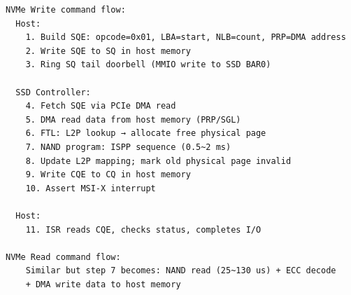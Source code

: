 \begin{lstlisting}
NVMe Write command flow:
  Host:
    1. Build SQE: opcode=0x01, LBA=start, NLB=count, PRP=DMA address
    2. Write SQE to SQ in host memory
    3. Ring SQ tail doorbell (MMIO write to SSD BAR0)

  SSD Controller:
    4. Fetch SQE via PCIe DMA read
    5. DMA read data from host memory (PRP/SGL)
    6. FTL: L2P lookup → allocate free physical page
    7. NAND program: ISPP sequence (0.5~2 ms)
    8. Update L2P mapping; mark old physical page invalid
    9. Write CQE to CQ in host memory
    10. Assert MSI-X interrupt

  Host:
    11. ISR reads CQE, checks status, completes I/O

NVMe Read command flow:
    Similar but step 7 becomes: NAND read (25~130 us) + ECC decode
    + DMA write data to host memory
\end{lstlisting}

